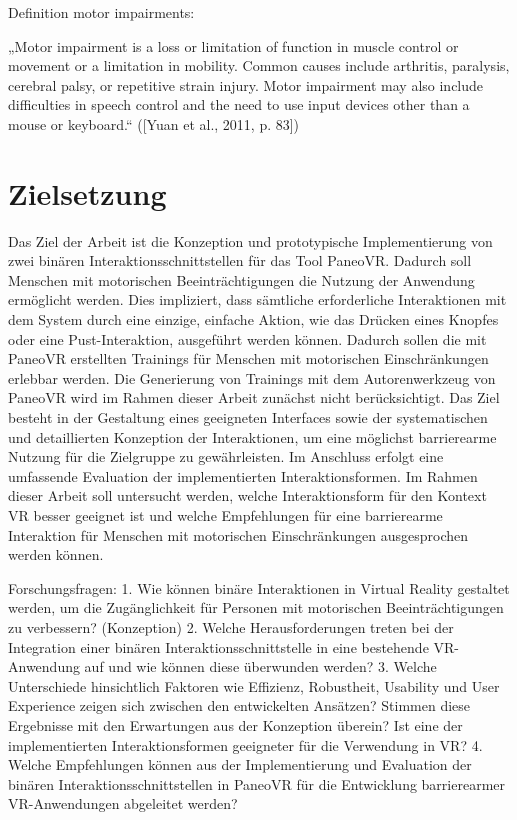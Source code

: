 Definition motor impairments:
    
„Motor impairment is a loss or limitation of function in muscle control or movement or a limitation in mobility. Common causes include arthritis, paralysis, cerebral palsy, or repetitive strain injury. Motor impairment may also include difficulties in speech control and the need to use input devices other than a mouse or keyboard.“ ([Yuan et al., 2011, p. 83])


\section{Zielsetzung}

Das Ziel der Arbeit ist die Konzeption und prototypische Implementierung von zwei binären Interaktionsschnittstellen für das Tool PaneoVR. Dadurch soll Menschen mit motorischen Beeinträchtigungen die Nutzung der Anwendung ermöglicht werden. Dies impliziert, dass sämtliche erforderliche Interaktionen mit dem System durch eine einzige, einfache Aktion, wie das Drücken eines Knopfes oder eine Pust-Interaktion, ausgeführt werden können. Dadurch sollen die mit PaneoVR erstellten Trainings für Menschen mit motorischen Einschränkungen erlebbar werden. Die Generierung von Trainings mit dem Autorenwerkzeug von PaneoVR wird im Rahmen dieser Arbeit zunächst nicht berücksichtigt. Das Ziel besteht in der Gestaltung eines geeigneten Interfaces sowie der systematischen und detaillierten Konzeption der Interaktionen, um eine möglichst barrierearme Nutzung für die Zielgruppe zu gewährleisten. Im Anschluss erfolgt eine umfassende Evaluation der implementierten Interaktionsformen. Im Rahmen dieser Arbeit soll untersucht werden, welche Interaktionsform für den Kontext VR besser geeignet ist und welche Empfehlungen für eine barrierearme Interaktion für Menschen mit motorischen Einschränkungen ausgesprochen werden können. 

Forschungsfragen:
1.	Wie können binäre Interaktionen in Virtual Reality gestaltet werden, um die Zugänglichkeit für Personen mit motorischen Beeinträchtigungen zu verbessern? (Konzeption)
2.	Welche Herausforderungen treten bei der Integration einer binären Interaktionsschnittstelle in eine bestehende VR-Anwendung auf und wie können diese überwunden werden? 
3.  Welche Unterschiede hinsichtlich Faktoren wie Effizienz, Robustheit, Usability und User Experience zeigen sich zwischen den entwickelten Ansätzen? Stimmen diese Ergebnisse mit den Erwartungen aus der Konzeption überein? Ist eine der implementierten Interaktionsformen geeigneter für die Verwendung in VR?
4.	Welche Empfehlungen können aus der Implementierung und Evaluation der binären Interaktionsschnittstellen in PaneoVR für die Entwicklung barrierearmer VR-Anwendungen abgeleitet werden? 


